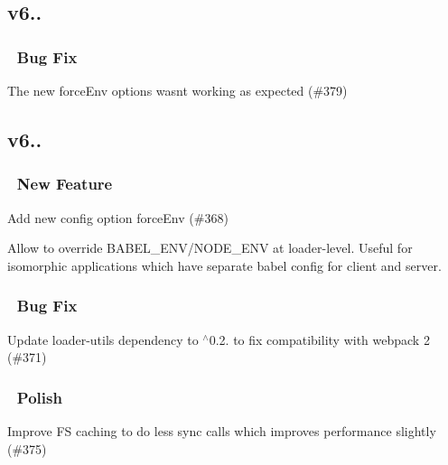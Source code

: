\subsection*{v6..}

\subsubsection*{🐛 Bug Fix}


\begin{DoxyItemize}
\item The new {\ttfamily force\+Env} options wasn\textquotesingle{}t working as expected (\#379) 
\end{DoxyItemize}

\subsection*{v6..}

\subsubsection*{🚀 New Feature}


\begin{DoxyItemize}
\item Add new config option {\ttfamily force\+Env} (\#368) 
\end{DoxyItemize}

Allow to override B\+A\+B\+E\+L\+\_\+\+E\+N\+V/\+N\+O\+D\+E\+\_\+\+E\+NV at loader-\/level. Useful for isomorphic applications which have separate babel config for client and server.

\subsubsection*{🐛 Bug Fix}


\begin{DoxyItemize}
\item Update loader-\/utils dependency to $^\wedge$0.2. to fix compatibility with webpack 2 (\#371) 
\end{DoxyItemize}

\subsubsection*{💅 Polish}


\begin{DoxyItemize}
\item Improve FS caching to do less sync calls which improves performance slightly (\#375) 
\end{DoxyItemize}

